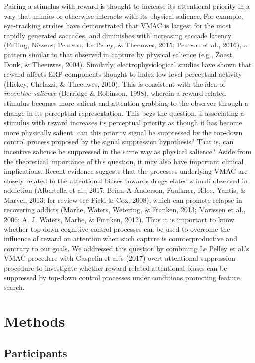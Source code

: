 \documentclass[jou, a4paper, noextraspace,floatsintext]{apa6}
\theoremstyle{definition}
\theoremstyle{definition}
\theoremstyle{definition}
\theoremstyle{remark}
\begin{document}
Pairing a stimulus with reward is thought to increase its attentional
priority in a way that mimics or otherwise interacts with its physical
salience. For example, eye-tracking studies have demonstrated that VMAC
is largest for the most rapidly generated saccades, and diminishes with
increasing saccade latency (Failing, Nissens, Pearson, Le Pelley, \&
Theeuwes, 2015; Pearson et al., 2016), a pattern similar to that
observed in capture by physical salience (e.g., Zoest, Donk, \&
Theeuwes, 2004). Similarly, electrophysiological studies have shown that
reward affects ERP components thought to index low-level perceptual
activity (Hickey, Chelazzi, \& Theeuwes, 2010). This is consistent with
the idea of \emph{incentive salience} (Berridge \& Robinson, 1998),
wherein a reward-related stimulus becomes more salient and attention
grabbing to the observer through a change in its perceptual
representation. This begs the question, if associating a stimulus with
reward increases its perceptual priority as though it has become more
physically salient, can this priority signal be suppressed by the
top-down control process proposed by the signal suppression hypothesis?
That is, can incentive salience be suppressed in the same way as
physical salience? Aside from the theoretical importance of this
question, it may also have important clinical implications. Recent
evidence suggests that the processes underlying VMAC are closely related
to the attentional biases towards drug-related stimuli observed in
addiction (Albertella et al., 2017; Brian A Anderson, Faulkner, Rilee,
Yantis, \& Marvel, 2013; for review see Field \& Cox, 2008), which can
promote relapse in recovering addicts (Marhe, Waters, Wetering, \&
Franken, 2013; Marissen et al., 2006; A. J. Waters, Marhe, \& Franken,
2012). Thus it is important to know whether top-down cognitive control
processes can be used to overcome the influence of reward on attention
when such capture is counterproductive and contrary to our goals. We
addressed this question by combining Le Pelley et al.'s VMAC procedure
with Gaspelin et al.'s (2017) overt attentional suppression procedure to
investigate whether reward-related attentional biases can be suppressed
by top-down control processes under conditions promoting feature search.

\section{Methods}\label{methods}

\subsection{Participants}\label{participants}
\end{document}
